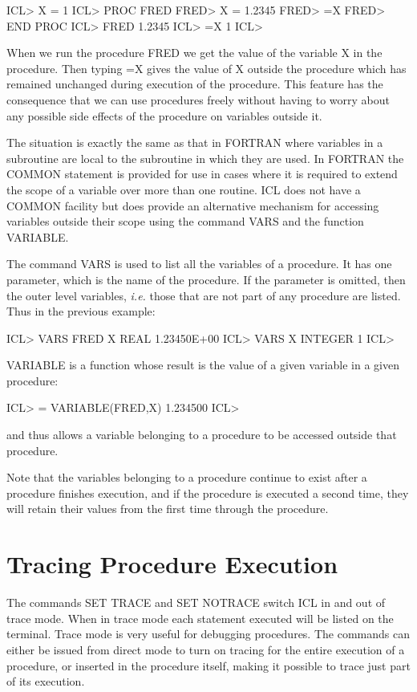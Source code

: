 \documentclass[twoside,11pt,nolof,chapters]{starlink}
\begin{document}
\begin{terminalv}
ICL> X = 1
ICL> PROC FRED
FRED> X = 1.2345
FRED> =X
FRED> END PROC
ICL> FRED
1.2345
ICL> =X
       1
ICL>
\end{terminalv}
When we run the procedure FRED we get the value of the variable X in the
procedure. Then typing =X gives the value of X outside the procedure which
has remained unchanged during execution of the procedure. This feature has the
consequence that we can use procedures freely without having to worry about
any possible side effects of the procedure on variables outside it.

The situation is exactly the same as that in FORTRAN where variables in a
subroutine are local to the subroutine in which they are used. In FORTRAN
the COMMON statement is provided for use in cases where it is required to
extend the scope of a variable over more than one routine. ICL does not have
a COMMON facility but does provide an alternative mechanism for accessing
variables outside their scope using the command VARS and the function
VARIABLE.

The command VARS is used to list all the variables of a procedure.
It has one parameter, which is the name of the procedure. If the parameter
is omitted, then the outer level variables, \emph{i.e.} those that are not part
of any procedure are listed. Thus in the previous example:
\begin{terminalv}
    ICL> VARS FRED
                     X  REAL     1.23450E+00
    ICL> VARS
                     X  INTEGER          1
    ICL>
\end{terminalv}
VARIABLE is a function whose result is the value of a given variable in
a given procedure:
\begin{terminalv}
    ICL> = VARIABLE(FRED,X)
    1.234500
    ICL>
\end{terminalv}
and thus allows a variable belonging to a procedure to be accessed outside
that procedure.

Note that the variables belonging to a procedure continue to exist after
a procedure finishes execution, and if the procedure is executed a second time,
they will retain their values from the first time through the procedure.

\section{Tracing Procedure Execution}
The commands SET TRACE and SET NOTRACE switch ICL in and out of trace mode.
When in trace mode each statement executed will be listed on the terminal.
Trace mode is very useful for debugging procedures. The commands can either be
issued from direct mode to turn on tracing for the entire execution of a
procedure, or inserted in the procedure itself, making it possible to trace
just part of its execution.
\end{document}
